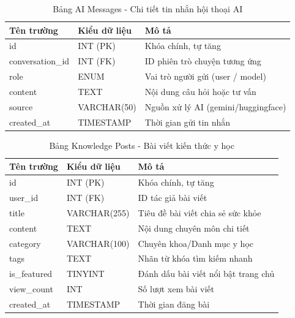 \documentclass[13pt,a4paper]{extreport}
\begin{document}
\begin{table}[H]
\centering
\caption{Bảng AI Messages - Chi tiết tin nhắn hội thoại AI}
\begin{tabular}{|l|l|l|}
\hline
\textbf{Tên trường} & \textbf{Kiểu dữ liệu} & \textbf{Mô tả} \\
\hline
id & INT (PK) & Khóa chính, tự tăng \\
conversation\_id & INT (FK) & ID phiên trò chuyện tương ứng \\
role & ENUM & Vai trò người gửi (user / model) \\
content & TEXT & Nội dung câu hỏi hoặc tư vấn \\
source & VARCHAR(50) & Nguồn xử lý AI (gemini/huggingface) \\
created\_at & TIMESTAMP & Thời gian gửi tin nhắn \\
\hline
\end{tabular}
\end{table}

\begin{table}[H]
\centering
\caption{Bảng Knowledge Posts - Bài viết kiến thức y học}
\begin{tabular}{|l|l|l|}
\hline
\textbf{Tên trường} & \textbf{Kiểu dữ liệu} & \textbf{Mô tả} \\
\hline
id & INT (PK) & Khóa chính, tự tăng \\
user\_id & INT (FK) & ID tác giả bài viết \\
title & VARCHAR(255) & Tiêu đề bài viết chia sẻ sức khỏe \\
content & TEXT & Nội dung chuyên môn chi tiết \\
category & VARCHAR(100) & Chuyên khoa/Danh mục y học \\
tags & TEXT & Nhãn từ khóa tìm kiếm nhanh \\
is\_featured & TINYINT & Đánh dấu bài viết nổi bật trang chủ \\
view\_count & INT & Số lượt xem bài viết \\
created\_at & TIMESTAMP & Thời gian đăng bài \\
\hline
\end{tabular}
\end{table}
\end{document}
